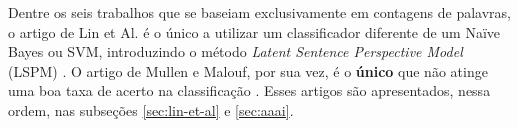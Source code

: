 

Dentre os seis trabalhos que se baseiam exclusivamente em contagens de palavras, o artigo de Lin et Al. é o único a utilizar um classificador diferente de um Naïve Bayes ou SVM, introduzindo o método \emph{Latent Sentence Perspective Model} (LSPM) \cite{lin-et-al2006}. O artigo de Mullen e Malouf, por sua vez, é o \textbf{único} que não atinge uma boa taxa de acerto na classificação \cite{aaai-politics}. Esses artigos são apresentados, nessa ordem, nas subseções \ref{sec:lin-et-al} e \ref{sec:aaai}. %

